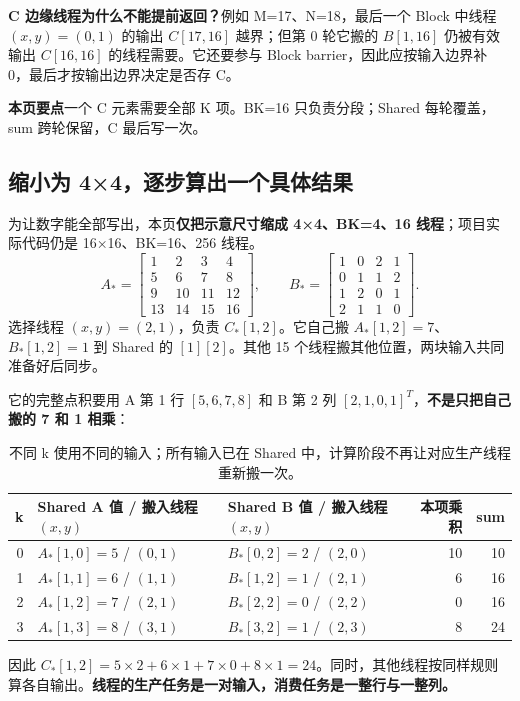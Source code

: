 \documentclass[UTF8,11pt,a4paper,fontset=fandol]{ctexart}
\newcommand{\takeaway}[1]{\par\noindent\colorbox{PaleBlue}{\parbox{\dimexpr\linewidth-2\fboxsep\relax}{\textbf{本页要点}\quad #1}}\par}
\newcommand{\pagebreakhere}{\clearpage}
\begin{document}
\textbf{C 边缘线程为什么不能提前返回？}例如 M=17、N=18，最后一个 Block 中线程 $(x,y)=(0,1)$ 的输出 $C[17,16]$ 越界；但第 0 轮它搬的 $B[1,16]$ 仍被有效输出 $C[16,16]$ 的线程需要。它还要参与 Block barrier，因此应按输入边界补 0，最后才按输出边界决定是否存 C。
\takeaway{一个 C 元素需要全部 K 项。BK=16 只负责分段；Shared 每轮覆盖，sum 跨轮保留，C 最后写一次。}
\pagebreakhere

\subsection{缩小为 4×4，逐步算出一个具体结果}
为让数字能全部写出，本页\textbf{仅把示意尺寸缩成 4×4、BK=4、16 线程}；项目实际代码仍是 16×16、BK=16、256 线程。
\[
A_* = \begin{bmatrix}1&2&3&4\\5&6&7&8\\9&10&11&12\\13&14&15&16\end{bmatrix},\qquad
B_* = \begin{bmatrix}1&0&2&1\\0&1&1&2\\1&2&0&1\\2&1&1&0\end{bmatrix}.
\]
选择线程 $(x,y)=(2,1)$，负责 $C_*[1,2]$。它自己搬 $A_*[1,2]=7$、$B_*[1,2]=1$ 到 Shared 的 $[1][2]$。其他 15 个线程搬其他位置，两块输入共同准备好后同步。

它的完整点积要用 A 第 1 行 $[5,6,7,8]$ 和 B 第 2 列 $[2,1,0,1]^T$，\textbf{不是只把自己搬的 7 和 1 相乘}：
\begin{table}[H]\centering\small
\begin{tabular}{rllrr}
\toprule
k & Shared A 值 / 搬入线程 $(x,y)$ & Shared B 值 / 搬入线程 $(x,y)$ & 本项乘积 & sum\\\midrule
0 & $A_*[1,0]=5$ / $(0,1)$ & $B_*[0,2]=2$ / $(2,0)$ & 10 & 10\\
1 & $A_*[1,1]=6$ / $(1,1)$ & $B_*[1,2]=1$ / $(2,1)$ & 6 & 16\\
2 & $A_*[1,2]=7$ / $(2,1)$ & $B_*[2,2]=0$ / $(2,2)$ & 0 & 16\\
3 & $A_*[1,3]=8$ / $(3,1)$ & $B_*[3,2]=1$ / $(2,3)$ & 8 & 24\\\bottomrule
\end{tabular}
\caption{不同 k 使用不同的输入；所有输入已在 Shared 中，计算阶段不再让对应生产线程重新搬一次。}
\end{table}
因此 $C_*[1,2]=5\times2+6\times1+7\times0+8\times1=24$。同时，其他线程按同样规则算各自输出。\textbf{线程的生产任务是一对输入，消费任务是一整行与一整列。}
\end{document}
